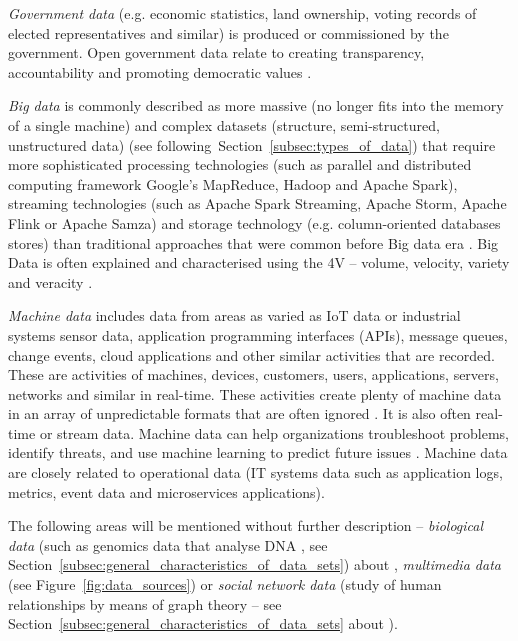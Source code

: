 																		
				\textit{Government data} (e.g. economic statistics, land ownership, voting records of elected representatives and similar) is produced or commissioned by the government. Open government data relate to creating transparency, accountability and promoting democratic values \cite{Charalabidis2018}.
				
				\textit{Big data} is commonly described as more massive (no longer fits into the memory of a single machine) and complex datasets (structure, semi-structured, unstructured data) (see following~Section~\ref{subsec:types_of_data}) that require more sophisticated processing technologies (such as parallel and distributed computing framework Google’s MapReduce, Hadoop and Apache Spark), streaming technologies (such as Apache Spark Streaming, Apache Storm, Apache Flink or Apache Samza) and storage technology (e.g. column-oriented databases stores) than traditional approaches that were common before Big data era \cite{Charalabidis2018} \cite{Baldassarre2016}.	Big Data is often explained and characterised using the 4V -- volume, velocity, variety and veracity  \cite{Charalabidis2018}.
					
				\emph{Machine data} includes data from areas as varied as IoT data or industrial systems sensor data, application programming interfaces (APIs), message queues, change events, cloud applications and other similar activities that are recorded. These are activities of machines, devices, customers, users, applications, servers, networks and similar in real-time. These activities create plenty of machine data in an array of unpredictable formats that are often ignored \cite{Bridgwater2018}. It is also often real-time or stream data. Machine data can help organizations troubleshoot problems, identify threats, and use machine learning to predict future issues \cite{Bridgwater2018}. Machine data are closely related to operational data (IT systems data such as application logs, metrics, event data and microservices applications)\cite{Bridgwater2018}.	
						
				The following areas will be mentioned without further description -- \textit{biological data} (such as genomics data that analyse DNA \cite{Bridgwater2018}, see Section~\ref{subsec:general_characteristics_of_data_sets}) about , \textit{multimedia data} (see Figure~\ref{fig:data_sources}) or \textit{social network data} (study of human relationships by means of graph theory \cite{Aggarwal2015} -- see Section~\ref{subsec:general_characteristics_of_data_sets} about ).
							
